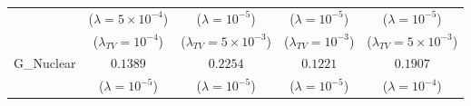 \documentclass{article}
\begin{document}
\begin{table}[h!]
{\begin{tabular}{|c|c|c|c|c|}
			                   &($\lambda = 5\times 10^{-4}$)     & ($\lambda = 10^{-5} $)               & ($\lambda = 10^{-5} $)      & ($\lambda = 10^{-5}$)   \\
			                   &($\lambda_{TV} = 10^{-4} $)       & ($\lambda_{TV} = 5 \times 10^{-3} $) & ($\lambda_{TV} = 10^{-3} $) & ($\lambda_{TV} = 5\times 10^{-3} $)   \\
			                   \hline
			G\_Nuclear         &  $\mathbf{0.1389}$  &  $\mathbf{0.2254}$  &  $\mathbf{0.1221}$   &  $\mathbf{0.1907}$   \\
			                   &($\lambda = 10^{-5}$)  & ($\lambda = 10^{-5}$) & ($\lambda = 10^{-5}$) & ($\lambda = 10^{-4}$)    \\
			                   \hline
    \end{tabular}
    }
 \label{sreTable}
\end{table}
\end{document}
